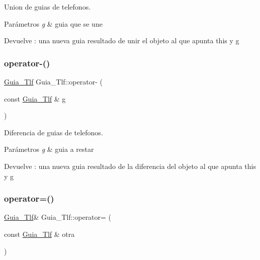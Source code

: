 Union de guias de telefonos. 


\begin{DoxyParams}{Parámetros}
{\em g} & guia que se une \\
\hline
\end{DoxyParams}
\begin{DoxyReturn}{Devuelve}
\+: una nueva guia resultado de unir el objeto al que apunta this y g 
\end{DoxyReturn}
\mbox{\label{classGuia__Tlf_ac381d53f275ce769830e07fbc56902b0}} 
\subsubsection{\texorpdfstring{operator-\/()}{operator-()}}
{\footnotesize\ttfamily \hyperlink{classGuia__Tlf}{Guia\+\_\+\+Tlf} Guia\+\_\+\+Tlf\+::operator-\/ (\begin{DoxyParamCaption}\item[{const \hyperlink{classGuia__Tlf}{Guia\+\_\+\+Tlf} \&}]{g }\end{DoxyParamCaption})}



Diferencia de guias de telefonos. 


\begin{DoxyParams}{Parámetros}
{\em g} & guia a restar \\
\hline
\end{DoxyParams}
\begin{DoxyReturn}{Devuelve}
\+: una nueva guia resultado de la diferencia del objeto al que apunta this y g 
\end{DoxyReturn}
\mbox{\label{classGuia__Tlf_afaeef82d19012aceb68167e3592b2106}} 
\subsubsection{\texorpdfstring{operator=()}{operator=()}}
{\footnotesize\ttfamily \hyperlink{classGuia__Tlf}{Guia\+\_\+\+Tlf}\& Guia\+\_\+\+Tlf\+::operator= (\begin{DoxyParamCaption}\item[{const \hyperlink{classGuia__Tlf}{Guia\+\_\+\+Tlf} \&}]{otra }\end{DoxyParamCaption})}



